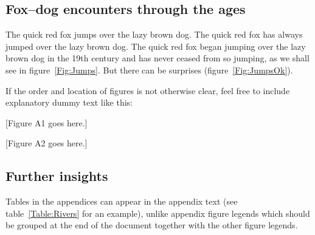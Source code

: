 \documentclass[11pt]{article}
\begin{document}
	
	\renewcommand{\theequation}{A\arabic{equation}}
	\renewcommand{\thetable}{A\arabic{table}}
	\setcounter{equation}{0}  %
	\setcounter{figure}{0}
	\setcounter{table}{0}
	
	\subsection*{Fox--dog encounters through the ages}
	
	The quick red fox jumps over the lazy brown dog. The quick red fox has always jumped over the lazy brown dog. The quick red fox began jumping over the lazy brown dog in the 19th century and has never ceased from so jumping, as we shall see in figure~\ref{Fig:Jumps}. But there can be surprises (figure~\ref{Fig:JumpsOk}).
	
	If the order and location of figures is not otherwise clear, feel free to include explanatory dummy text like this:
	
	[Figure A1 goes here.]
	
	[Figure A2 goes here.]
	
	\subsection*{Further insights}
	
	Tables in the appendices can appear in the appendix text (see table~\ref{Table:Rivers} for an example), unlike appendix figure legends which should be grouped at the end of the document together with the other figure legends.
	
\end{document}
